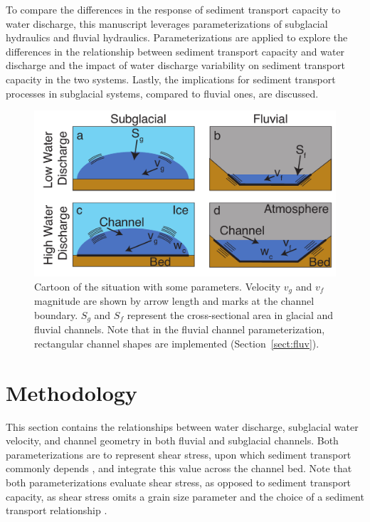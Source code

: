 \documentclass[11pt]{article}
\begin{document}
\begin{spacing}{1}
          To compare the differences in the response of sediment transport capacity to water discharge, this manuscript leverages parameterizations of subglacial hydraulics and fluvial hydraulics.
          Parameterizations are applied to explore the differences in the relationship between sediment transport capacity and water discharge and the impact of water discharge variability on sediment transport capacity in the two systems.
          Lastly, the implications for sediment transport processes in subglacial systems, compared to fluvial ones, are discussed.
        
          \begin{center}
            \begin{figure}[H]
              \includegraphics[width=0.9\linewidth]{Cartoon.pdf}
              \caption{Cartoon of the situation with some parameters. Velocity $v_g$ and $v_f$ magnitude are shown by arrow length and marks at the channel boundary. $S_g$ and $S_f$ represent the cross-sectional area in glacial and fluvial channels.  Note that in the fluvial channel parameterization, rectangular channel shapes are implemented (Section~\ref{sect:fluv}).} 
              \label{fig:cartoon}
            \end{figure}
          \end{center}
          
          \section{Methodology}
          \label{sect:meth}
          This section contains the relationships between water discharge, subglacial water velocity, and channel geometry in both fluvial and subglacial channels.
          Both parameterizations are to represent shear stress, upon which sediment transport commonly depends \citep[][]{shields1936}, and integrate this value across the channel bed.
          Note that both parameterizations evaluate shear stress, as opposed to sediment transport capacity, as shear stress omits a grain size parameter and the choice of a sediment transport relationship \citep{shields1936}.
          

\end{spacing}
\end{document}
